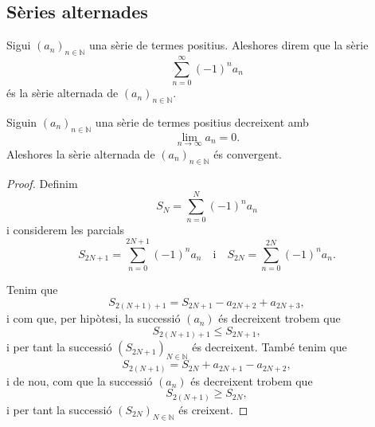 \documentclass[../Apunts.tex]{subfiles}
\begin{document}
	\subsection{Sèries alternades}
	\begin{definition}
		\label{def:sèrie alternada}
		Sigui \((a_{n})_{n\in\mathbb{N}}\) una sèrie de termes positius. Aleshores direm que la sèrie
		\[\sum_{n=0}^{\infty}(-1)^{n}a_{n}\]
		és la sèrie alternada de \((a_{n})_{n\in\mathbb{N}}\).
	\end{definition}
	\begin{theorem}
		\label{thm:criteri de Leibniz per sèries alternades}
		Siguin \((a_{n})_{n\in\mathbb{N}}\) una sèrie de termes positius decreixent amb 
		\[\lim_{n\to\infty}a_{n}=0.\]
		Aleshores la sèrie alternada de \((a_{n})_{n\in\mathbb{N}}\) és convergent.
		\begin{proof}
			Definim
			\begin{equation}
				\label{thm:criteri de Leibniz per sèries alternades:eq1}
				S_{N}=\sum_{n=0}^{N}(-1)^{n}a_{n}
			\end{equation}
			i considerem les parcials
			\[S_{2N+1}=\sum_{n=0}^{2N+1}(-1)^{n}a_{n}\quad\text{i}\quad S_{2N}=\sum_{n=0}^{2N}(-1)^{n}a_{n}.\]
			
			Tenim que
			\[S_{2(N+1)+1}=S_{2N+1}-a_{2N+2}+a_{2N+3},\]
			i com que, per hipòtesi, la successió \((a_{n})\) és decreixent trobem que
			\[S_{2(N+1)+1}\leq S_{2N+1},\]
			i per tant la successió \((S_{2N+1})_{N\in\mathbb{N}}\) és decreixent. També tenim que
			\[S_{2(N+1)}=S_{2N}+a_{2N+1}-a_{2N+2},\]
			i de nou, com que la successió \((a_{n})\) és decreixent trobem que
			\[S_{2(N+1)}\geq S_{2N},\]
			i per tant la successió \((S_{2N})_{N\in\mathbb{N}}\) és creixent.
			

\end{proof}
\end{theorem}
\end{document}
